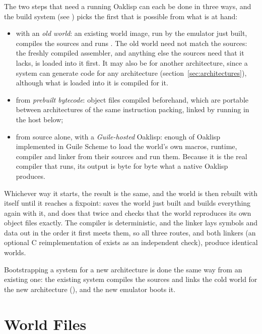 The two steps that need a running Oaklisp can each be done in three
ways, and the build system (see ) picks the first that
is possible from what is at hand:
\begin{itemize}
\item with an \emph{old world}: an existing world image, run by the
  emulator just built, compiles the sources and runs .
  The old world need not match the sources: the freshly compiled
  assembler, and anything else the sources need that it lacks, is
  loaded into it first.  It may also be for another architecture,
  since a system can generate code for any architecture
  (section~\ref{sec:architectures}), although what is loaded into it
  is compiled for it.
\item from \emph{prebuilt bytecode}: object files compiled beforehand,
  which are portable between architectures of the same instruction
  packing, linked by  running in the host below;
\item from source alone, with a \emph{Guile-hosted} Oaklisp: enough
  of Oaklisp implemented in Guile Scheme to load the world's own
  macros, runtime, compiler and linker from their sources and run
  them.  Because it is the real compiler that runs, its output is byte
  for byte what a native Oaklisp produces.
\end{itemize}
Whichever way it starts, the result is the same, and the world is
then rebuilt with itself until it reaches a fixpoint:  saves the world just built and builds everything again
with it, and  does that twice and checks that the
world reproduces its own object files exactly.  The compiler is
deterministic, and the linker lays symbols and data out in the order
it first meets them, so all three routes, and both linkers (an
optional C reimplementation of  exists as an independent
check), produce identical worlds.

Bootstrapping a system for a new architecture is done the same way
from an existing one: the existing system compiles the sources and
links the cold world for the new architecture (), and
the new emulator boots it.

\section{World Files} \label{sec:worldfiles}

